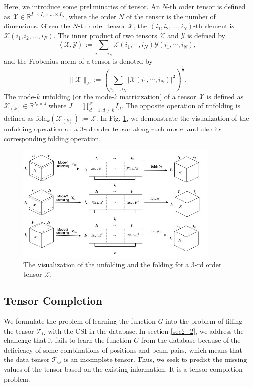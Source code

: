 \documentclass[12pt, draftcls, onecolumn]{IEEEtran}
\theoremstyle{plain}
\theoremstyle{definition}
\theoremstyle{remark}
\begin{document}
Here, we introduce some preliminaries of tensor.
An $N$-th order tensor is defined as $\mathcal{X}\in\mathbb{R}^{I_1 \times I_2\times\dots\times I_N}$, where the order $N$ of the tensor is the number of dimensions.
Given the $N$-th order tensor $\mathcal{X}$, the $(i_1,i_2,\dots,i_N)$-th element is $\mathcal{X}(i_1,i_2,\dots,i_N)$.
The inner product of two tensors $\mathcal{X}$ and $\mathcal{Y}$ is defined by $$\left<\mathcal{X},\mathcal{Y}\right>:=\sum_{i_1,\cdots,i_N}\mathcal{X}(i_1,\cdots,i_N)\mathcal{Y}(i_1,\cdots,i_N),$$
and the Frobenius norm of a tensor is denoted by $$\lVert\mathcal{X}\rVert_F:=\left(\sum_{i_1,\cdots,i_N}\lvert\mathcal{X}(i_1,\cdots,i_N)\rvert^2\right)^{\frac{1}{2}}.$$
The mode-$k$ unfolding (or the mode-$k$ matricization) of a tensor $\mathcal{X}$ is defined as $\mathcal{X}_{(k)}\in\mathbb{R}^{I_k\times J}$ where $J=\prod_{d=1,d\neq k}^{N}I_d$.
The opposite operation of unfolding is defined as $\text{fold}_k(\mathcal{X}_{(k)}) := \mathcal{X}$.
In Fig. \ref{fig:Tensor_unfolding_folding}, we demonstrate the visualization of the unfolding operation on a $3$-rd order tensor along each mode, and also its corresponding folding operation.

\begin{figure}[t]
	\centering
	\includegraphics[width=10cm]{Tensor_unfolding_folding.jpg}
	\caption{The visualization of the unfolding and the folding for a $3$-rd order tensor $\mathcal{X}$.}
	\label{fig:Tensor_unfolding_folding}
\end{figure}


\subsection{Tensor Completion}
We formulate the problem of learning the function $G$ into the problem of filling the tensor $\mathcal T_G$ with the CSI in the database.
In section \ref{sec2_2}, we address the challenge that it fails to learn the function $G$ from the database because of the deficiency of some combinations of positions and beam-pairs, which means that the data tensor $\mathcal{T}_G$ is an incomplete tensor.
Thus, we seek to predict the missing values of the tensor based on the existing information.
It is a tensor completion problem.
\end{document}
